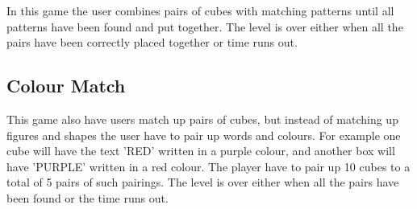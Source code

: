 In this game the user combines pairs of cubes with matching patterns until all patterns have been found and put together.
The level is over either when all the pairs have been correctly placed together or time runs out.


\subsection{Colour Match}
	\label{game:colour_match}

This game also have users match up pairs of cubes, but instead of matching up figures and shapes the user have to pair up words and colours. For example one cube will have the text 'RED' written in a purple colour, and another box will have 'PURPLE' written in a red colour. The player have to pair up 10 cubes to a total of 5 pairs of such pairings.
The level is over either when all the pairs have been found or the time runs out.

